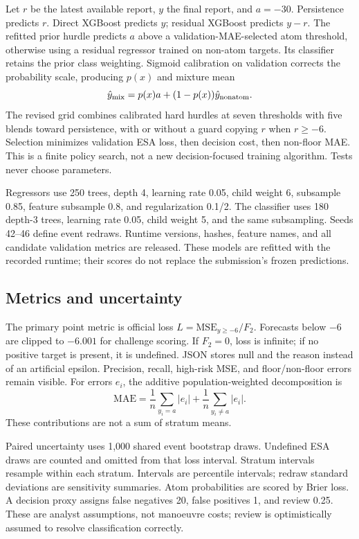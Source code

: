 \documentclass[10pt]{article}
\begin{document}
Let $r$ be the latest available report, $y$ the final report, and $a=-30$. Persistence predicts $r$. Direct XGBoost predicts $y$; residual XGBoost predicts $y-r$. The refitted prior hurdle predicts $a$ above a validation-MAE-selected atom threshold, otherwise using a residual regressor trained on non-atom targets. Its classifier retains the prior class weighting. Sigmoid calibration on validation corrects the probability scale, producing $p(x)$ and mixture mean
\[
\hat y_{\rm mix}=p(x)a+(1-p(x))\hat y_{\rm nonatom}.
\]
The revised grid combines calibrated hard hurdles at seven thresholds with five blends toward persistence, with or without a guard copying $r$ when $r\geq-6$. Selection minimizes validation ESA loss, then decision cost, then non-floor MAE. This is a finite policy search, not a new decision-focused training algorithm. Tests never choose parameters.

Regressors use 250 trees, depth 4, learning rate 0.05, child weight 6, subsample 0.85, feature subsample 0.8, and regularization 0.1/2. The classifier uses 180 depth-3 trees, learning rate 0.05, child weight 5, and the same subsampling. Seeds 42--46 define event redraws. Runtime versions, hashes, feature names, and all candidate validation metrics are released. These models are refitted with the recorded runtime; their scores do not replace the submission's frozen predictions.

\subsection{Metrics and uncertainty}
The primary point metric is official loss $L=\mathrm{MSE}_{y\geq-6}/F_2$. Forecasts below $-6$ are clipped to $-6.001$ for challenge scoring. If $F_2=0$, loss is infinite; if no positive target is present, it is undefined. JSON stores null and the reason instead of an artificial epsilon. Precision, recall, high-risk MSE, and floor/non-floor errors remain visible. For errors $e_i$, the additive population-weighted decomposition is
\[
\mathrm{MAE}=\frac{1}{n}\sum_{y_i=a}|e_i|+\frac{1}{n}\sum_{y_i\ne a}|e_i|.
\]
These contributions are not a sum of stratum means.

Paired uncertainty uses 1,000 shared event bootstrap draws. Undefined ESA draws are counted and omitted from that loss interval. Stratum intervals resample within each stratum. Intervals are percentile intervals; redraw standard deviations are sensitivity summaries. Atom probabilities are scored by Brier loss. A decision proxy assigns false negatives 20, false positives 1, and review 0.25. These are analyst assumptions, not manoeuvre costs; review is optimistically assumed to resolve classification correctly.
\end{document}
